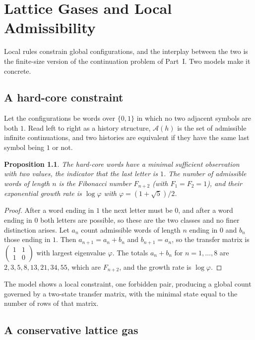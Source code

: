 \documentclass[11pt,oneside]{book}
\newtheorem{proposition}[theorem]{Proposition}
\theoremstyle{definition}
\theoremstyle{remark}
\newcommand{\Adm}{\mathcal{A}}
\begin{document}
\chapter{Lattice Gases and Local Admissibility}\label{ch:lattice}

Local rules constrain global configurations, and the interplay between the two is the finite-size version of the continuation problem of Part~I. Two models make it concrete.

\section*{A hard-core constraint}

Let the configurations be words over $\{0,1\}$ in which no two adjacent symbols are both $1$. Read left to right as a history structure, $\Adm(h)$ is the set of admissible infinite continuations, and two histories are equivalent if they have the same last symbol being $1$ or not.

\begin{proposition}\label{prop:golden}
The hard-core words have a minimal sufficient observation with two values, the indicator that the last letter is $1$. The number of admissible words of length $n$ is the Fibonacci number $F_{n+2}$ (with $F_1=F_2=1$), and their exponential growth rate is $\log\varphi$ with $\varphi=(1+\sqrt5)/2$.
\end{proposition}

\begin{proof}
After a word ending in $1$ the next letter must be $0$, and after a word ending in $0$ both letters are possible, so these are the two classes and no finer distinction arises. Let $a_n$ count admissible words of length $n$ ending in $0$ and $b_n$ those ending in $1$. Then $a_{n+1}=a_n+b_n$ and $b_{n+1}=a_n$, so the transfer matrix is $\begin{pmatrix}1&1\\1&0\end{pmatrix}$ with largest eigenvalue $\varphi$. The totals $a_n+b_n$ for $n=1,\dots,8$ are $2,3,5,8,13,21,34,55$, which are $F_{n+2}$, and the growth rate is $\log\varphi$.
\end{proof}

The model shows a local constraint, one forbidden pair, producing a global count governed by a two-state transfer matrix, with the minimal state equal to the number of rows of that matrix.

\section*{A conservative lattice gas}
\end{document}
